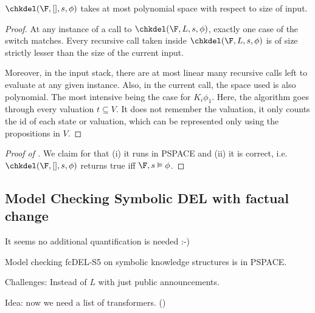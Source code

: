 \begin{theorem}
    $\chkdel(\F,[],s,\phi)$ takes at most polynomial space with respect to size of input.
\end{theorem}
\begin{proof}
    At any instance of a call to $\chkdel(\F,L,s,\phi)$, exactly one case of the switch matches. Every recursive call taken inside $\chkdel(\F,L,s,\phi)$ is of size strictly lesser than the size of the current input. 

    Moreover, in the input stack, there are at most linear many recursive calls left to evaluate at any given instance. Also, in the current call, the space used is also polynomial. The most intensive being the case for $K_i \phi_1$. Here, the algorithm goes through every valuation $t\subseteq V$. It does not remember the valuation, it only counts the id of each state or valuation, which can be represented only using the propositions in $V$. 
\end{proof}


\begin{proof}[Proof of ]
We claim for  that
(i) it runs in PSPACE and
(ii) it is correct, i.e.\ $\chkdel(\F, [], s, \phi)$ returns true iff $\F, s \vDash \phi$.

\end{proof}



\subsection{Model Checking Symbolic DEL with factual change}
It seems no additional quantification is needed :-) 


\begin{theorem}\label{thm:SymDEL}
Model checking fcDEL-S5 on symbolic knowledge structures is in PSPACE.
\end{theorem}

Challenges: Instead of $L$ with just public announcements.

Idea: now we need a list of transformers. (\cite{ComplexityDELAucherS13})


